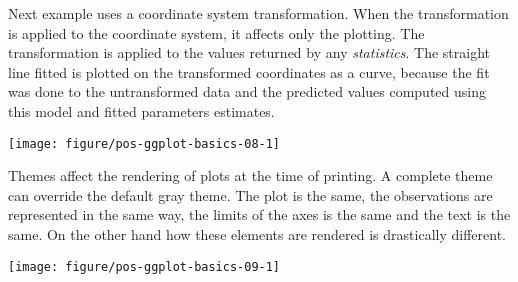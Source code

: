 \documentclass[krantz2]{krantz}\usepackage{knitr}%
\begin{document}
Next example uses a coordinate system transformation. When the transformation is applied to the coordinate system, it affects only the plotting. The transformation is applied to the values returned by any \emph{statistics}. The straight line fitted is plotted on the transformed coordinates as a curve, because the fit was done to the untransformed data and the predicted values computed using this model and fitted parameters estimates.

\begin{knitrout}\footnotesize
{}\color{fgcolor}\begin{kframe}
\begin{alltt}
\hlstd{(} 
       \hlstd{(}    \hlopt{+}
  \hlstd{()} \hlopt{+}
  \hlstd{(} \hlstd{=} \hlstd{,}  \hlstd{=} \hlstd{)} \hlopt{+}
  \hlstd{(} \hlstd{=} \hlstd{)}
\end{alltt}
\end{kframe}

{\centering \texttt{[image: figure/pos-ggplot-basics-08-1]} 

}



\end{knitrout}

Themes affect the rendering of plots at the time of printing. A complete theme can override the default gray theme. The plot is the same, the observations are represented in the same way, the limits of the axes is the same and the text is the same. On the other hand how these elements are rendered is drastically different.

\begin{knitrout}\footnotesize
{}\color{fgcolor}\begin{kframe}
\begin{alltt}
\hlstd{(} 
       \hlstd{(}    \hlopt{+}
  \hlstd{()} \hlopt{+}
  \hlstd{()}
\end{alltt}
\end{kframe}

{\centering \texttt{[image: figure/pos-ggplot-basics-09-1]} 

}



\end{knitrout}
\end{document}
